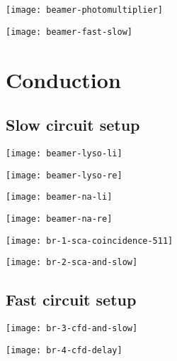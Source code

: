 \documentclass[english, fleqn]{beamer}
\begin{document}
\begin{frame}
    \texttt{[image: beamer-photomultiplier]}
\end{frame}


\begin{frame}
    \texttt{[image: beamer-fast-slow]}
\end{frame}


\section{Conduction}

\subsection{Slow circuit setup}

\begin{frame}
    \texttt{[image: beamer-lyso-li]}
\end{frame}


\begin{frame}
    \texttt{[image: beamer-lyso-re]}
\end{frame}


\begin{frame}
    \texttt{[image: beamer-na-li]}
\end{frame}


\begin{frame}
    \texttt{[image: beamer-na-re]}
\end{frame}


\begin{frame}
    \texttt{[image: br-1-sca-coincidence-511]}
\end{frame}


\begin{frame}
    \texttt{[image: br-2-sca-and-slow]}
\end{frame}


\subsection{Fast circuit setup}

\begin{frame}
    \texttt{[image: br-3-cfd-and-slow]}
\end{frame}


\begin{frame}
    \texttt{[image: br-4-cfd-delay]}
\end{frame}
\end{document}

